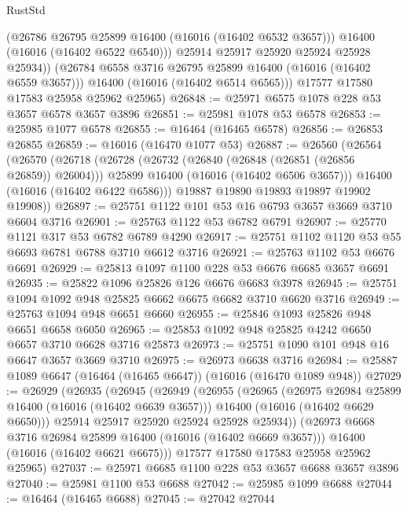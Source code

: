 \begin{lexlean}{RustStd}
\begin{coremodule}
              (@26786 @26795 @25899 @16400 (@16016 (@16402 @6532 @3657)))
              @16400
              (@16016 (@16402 @6522 @6540)))
            @25914
            @25917
            @25920
            @25924
            @25928
            @25934))
        (@26784 @6558 @3716 @26795 @25899 @16400 (@16016 (@16402 @6559 @3657)))
        @16400
        (@16016 (@16402 @6514 @6565)))
      @17577
      @17580
      @17583
      @25958
      @25962
      @25965)
@26848 := @25971 @6575 @1078 @228 @53 @3657 @6578 @3657 @3896
@26851 := @25981 @1078 @53 @6578
@26853 := @25985 @1077 @6578
@26855 := @16464 (@16465 @6578)
@26856 := @26853 @26855
@26859 := @16016 (@16470 @1077 @53)
@26887 := @26560
    (@26564
      (@26570
        (@26718
          (@26728
            (@26732 (@26840 (@26848 (@26851 (@26856 @26859)) @26004)))
            @25899
            @16400
            (@16016 (@16402 @6506 @3657)))
          @16400
          (@16016 (@16402 @6422 @6586)))
        @19887
        @19890
        @19893
        @19897
        @19902
        @19908))
@26897 := @25751 @1122 @101 @53 @16 @6793 @3657 @3669 @3710 @6604 @3716
@26901 := @25763 @1122 @53 @6782 @6791
@26907 := @25770 @1121 @317 @53 @6782 @6789 @4290
@26917 := @25751 @1102 @1120 @53 @55 @6693 @6781 @6788 @3710 @6612 @3716
@26921 := @25763 @1102 @53 @6676 @6691
@26929 := @25813 @1097 @1100 @228 @53 @6676 @6685 @3657 @6691
@26935 := @25822 @1096 @25826 @126 @6676 @6683 @3978
@26945 := @25751 @1094 @1092 @948 @25825 @6662 @6675 @6682 @3710 @6620 @3716
@26949 := @25763 @1094 @948 @6651 @6660
@26955 := @25846 @1093 @25826 @948 @6651 @6658 @6050
@26965 := @25853 @1092 @948 @25825 @4242 @6650 @6657 @3710 @6628 @3716 @25873
@26973 := @25751 @1090 @101 @948 @16 @6647 @3657 @3669 @3710
@26975 := @26973 @6638 @3716
@26984 := @25887 @1089 @6647 (@16464 (@16465 @6647)) (@16016 (@16470 @1089 @948))
@27029 := @26929
    (@26935
      (@26945
        (@26949
          (@26955
            (@26965
              (@26975 @26984 @25899 @16400 (@16016 (@16402 @6639 @3657)))
              @16400
              (@16016 (@16402 @6629 @6650)))
            @25914
            @25917
            @25920
            @25924
            @25928
            @25934))
        (@26973 @6668 @3716 @26984 @25899 @16400 (@16016 (@16402 @6669 @3657)))
        @16400
        (@16016 (@16402 @6621 @6675)))
      @17577
      @17580
      @17583
      @25958
      @25962
      @25965)
@27037 := @25971 @6685 @1100 @228 @53 @3657 @6688 @3657 @3896
@27040 := @25981 @1100 @53 @6688
@27042 := @25985 @1099 @6688
@27044 := @16464 (@16465 @6688)
@27045 := @27042 @27044

\end{coremodule}
\end{lexlean}
